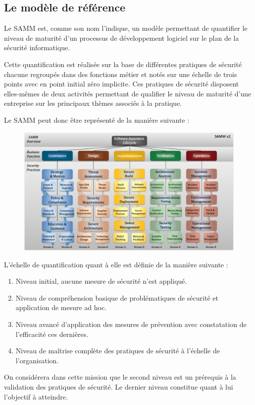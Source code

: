 \subsection{Le modèle de référence}

Le \ac{SAMM} est, comme son nom l'indique, un modèle permettant de quantifier le niveau de maturité d'un processus de 
développement logiciel sur le plan de la sécurité informatique. 

Cette quantification est réalisée sur la base de différentes pratiques de sécurité chacune regroupés dans des fonctions 
métier et notés sur une échelle de trois points avec en point initial zéro implicite. 
\newline Ces pratiques de sécurité disposent elles-mêmes de deux activités permettant de qualifier le niveau de maturité 
d'une entreprise sur les principaux thèmes associés à la pratique.

Le \ac{SAMM} peut donc être représenté de la manière suivante :

\begin{figure}[h]
    \centering
    \includegraphics[width=1\linewidth]{resources/img/Samm_v2.png}
    \label{fig:samm-rep}
\end{figure}

\newpage

L'échelle de quantification quant à elle est définie de la manière suivante : 
\begin{enumerate}
    \item Niveau initial, aucune mesure de sécurité n'est appliqué.
    \item Niveau de compréhension basique de problématiques de sécurité et application de mesure ad hoc.
    \item Niveau avancé d'application des mesures de prévention avec constatation de l'efficacité ces dernières.
    \item Niveau de maîtrise complète des pratiques de sécurité à l'échelle de l'organisation.
\end{enumerate}
On considérera dans cette mission que le second niveau est un prérequis à la validation des pratiques de sécurité.
Le dernier niveau constitue quant à lui l'objectif à atteindre.

